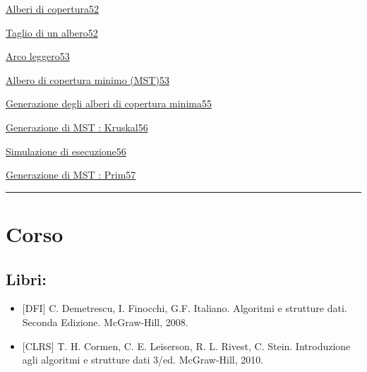 \documentclass{article}
\providecommand{\tightlist}{%
  \setlength{\itemsep}{0pt}\setlength{\parskip}{0pt}}
\begin{document}
{\protect\hyperlink{h.9btor4ygb1hb}{Alberi di copertura}}{\protect\hyperlink{h.9btor4ygb1hb}{52}}

{\protect\hyperlink{h.rdrr6bsx8ypo}{Taglio di un albero}}{\protect\hyperlink{h.rdrr6bsx8ypo}{52}}

{\protect\hyperlink{h.gfycwx7ubmbv}{Arco leggero}}{\protect\hyperlink{h.gfycwx7ubmbv}{53}}

{\protect\hyperlink{h.1evqcdl7exzv}{Albero di copertura minimo (MST)}}{\protect\hyperlink{h.1evqcdl7exzv}{53}}

{\protect\hyperlink{h.42rszsg7qe80}{Generazione degli alberi di copertura minima}}{\protect\hyperlink{h.42rszsg7qe80}{55}}

{\protect\hyperlink{h.tpoo55sx1m98}{Generazione di MST : Kruskal}}{\protect\hyperlink{h.tpoo55sx1m98}{56}}

{\protect\hyperlink{h.4n5zx1ni4b2b}{Simulazione di esecuzione}}{\protect\hyperlink{h.4n5zx1ni4b2b}{56}}

{\protect\hyperlink{h.l5wypo8krmqc}{Generazione di MST : Prim}}{\protect\hyperlink{h.l5wypo8krmqc}{57}}

\begin{center}\rule{0.5\linewidth}{\linethickness}\end{center}

\section{\texorpdfstring{{}}{}}\label{h.3n9hcd93vjrp}

\hypertarget{h.h3wcjgbw0vzs}{\section{\texorpdfstring{{Corso}}{Corso}}\label{h.h3wcjgbw0vzs}}

\hypertarget{h.h56evxq8lcvu}{\subsection{\texorpdfstring{{Libri:}}{Libri:}}\label{h.h56evxq8lcvu}}

\begin{itemize}
\tightlist
\item
  {{[}DFI{]} C. Demetrescu, I. Finocchi, G.F. Italiano. Algoritmi e
  strutture dati. Seconda Edizione. McGraw-Hill, 2008.}
\item
  {{[}CLRS{]} T. H. Cormen, C. E. Leiserson, R. L. Rivest, C. Stein.
  Introduzione agli algoritmi e strutture dati 3/ed. McGraw-Hill, 2010.}
\end{itemize}
\end{document}
